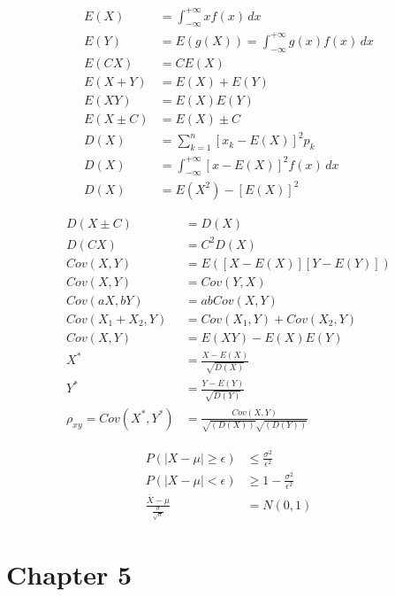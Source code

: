 \documentclass[12pt]{article}
\begin{document}
\begin{align}
    E(X) &= \int_{-\infty}^{+\infty} xf(x) \,dx \\
    E(Y) &= E(g(X)) = \int_{-\infty}^{+\infty} g(x)f(x) \,dx \\
    E(CX) &= CE(X)\\
    E(X+Y) &= E(X) +E(Y)\\
    E(XY) &= E(X) E(Y)\\
    E(X\pm C) &= E(X) \pm C\\
    D(X) &= \sum_{k = 1}^{n}  [x_k -E(X)]^2 p_k\\
    D(X) &= \int_{-\infty}^{+\infty} [x-E(X)]^2f(x) \,dx \\ 
    D(X) &= E(X^2) -[E(X)]^2
\end{align}
  

\begin{align}
    D(X\pm C) &= D(X) \\
    D(CX) &= C^2D(X)\\
    Cov(X,Y)&=E([X-E(X)][Y-E(Y)]) \\
    Cov(X,Y) &= Cov(Y,X) \\
    Cov(aX,bY) &= abCov(X,Y) \\
    Cov(X_1+X_2,Y) &= Cov(X_1,Y) + Cov(X_2,Y) \\
    Cov(X,Y) &= E(XY) -E(X)E(Y) \\
    X^* &= \frac{X-E(X)}{\sqrt{D(X)}}\\
    Y^* &= \frac{Y-E(Y)}{\sqrt{D(Y)}}\\
        \rho_{xy} = Cov(X^*,Y^*) &= \frac{Cov(X,Y)}{\sqrt{(D(X))} \sqrt{(D(Y))}} 
\end{align}

\begin{align}
    P(|X - \mu| \geq \epsilon) &\leq \frac{\sigma^2}{\epsilon^2} \\
    P(|X - \mu| < \epsilon) & \geq 1-\frac{\sigma^2}{\epsilon^2} \\
    \frac{\bar{X}-\mu}{\frac{\sigma}{\sqrt{n}}} &= N(0,1)
\end{align}

\section{Chapter 5}
\end{document}
